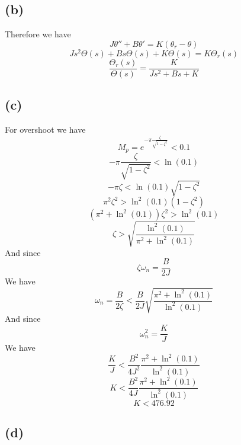 \documentclass[12pt]{article}
\begin{document}
\subsection*{(b)}
Therefore we have
$$J\theta''+B\theta'=K(\theta_r-\theta)$$
$$Js^2\Theta(s)+Bs\Theta(s)+K\Theta(s)=K\Theta_r(s)$$
$$\frac{\Theta_r(s)}{\Theta(s)}=\boxed{\frac{K}{Js^2+Bs+K}}$$
\subsection*{(c)}
For overshoot we have
$$M_p=e^{-\pi\frac{\zeta}{\sqrt{1-\zeta^2}}}<0.1$$
$$-\pi\frac{\zeta}{\sqrt{1-\zeta^2}}<\ln(0.1)$$
$$-\pi\zeta<\ln(0.1)\sqrt{1-\zeta^2}$$
$$\pi^2\zeta^2>\ln^2(0.1)(1-\zeta^2)$$
$$(\pi^2+\ln^2(0.1))\zeta^2>\ln^2(0.1)$$
$$\zeta>\sqrt{\frac{\ln^2(0.1)}{\pi^2+\ln^2(0.1)}}$$
And since 
$$\zeta\omega_n=\frac{B}{2J}$$
We have
$$\omega_n=\frac{B}{2\zeta}<\frac{B}{2J}\sqrt{\frac{\pi^2+\ln^2(0.1)}{\ln^2(0.1)}}$$
And since
$$\omega_n^2=\frac{K}{J}$$
We have
$$\frac{K}{J}<\frac{B^2}{4J^2}\frac{\pi^2+\ln^2(0.1)}{\ln^2(0.1)}$$
$$K<\frac{B^2}{4J}\frac{\pi^2+\ln^2(0.1)}{\ln^2(0.1)}$$
$$K<476.92$$
\subsection*{(d)}
\end{document}
